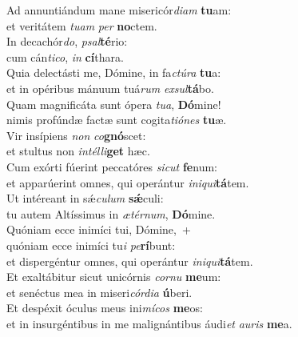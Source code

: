 \evenverse Ad annuntiándum mane misericór\textit{di}\textit{am} \textbf{tu}am:~\*\\
\evenverse et veritátem \textit{tu}\textit{am} \textit{per} \textbf{no}ctem.\\
\oddverse In decachór\textit{do}, \textit{psal}\textbf{té}rio:~\*\\
\oddverse cum cán\textit{ti}\textit{co}, \textit{in} \textbf{cí}thara.\\
\evenverse Quia delectásti me, Dómine, in fa\textit{ctú}\textit{ra} \textbf{tu}a:~\*\\
\evenverse et in opéribus mánuum tuá\textit{rum} \textit{ex}\textit{sul}\textbf{tá}bo.\\
\oddverse Quam magnificáta sunt ópera \textit{tu}\textit{a}, \textbf{Dó}mine!~\*\\
\oddverse nimis profúndæ factæ sunt cogita\textit{ti}\textit{ó}\textit{nes} \textbf{tu}æ.\\
\evenverse Vir insípiens \textit{non} \textit{co}\textbf{gnó}scet:~\*\\
\evenverse et stultus non \textit{in}\textit{tél}\textit{li}\textbf{get} hæc.\\
\oddverse Cum exórti fúerint peccatóres \textit{si}\textit{cut} \textbf{fe}num:~\*\\
\oddverse et apparúerint omnes, qui operántur \textit{i}\textit{ni}\textit{qui}\textbf{tá}tem.\\
\evenverse Ut intéreant in sǽ\textit{cu}\textit{lum} \textbf{sǽ}culi:~\*\\
\evenverse tu autem Altíssimus in \textit{æ}\textit{tér}\textit{num}, \textbf{Dó}mine.\\
\oddverse Quóniam ecce inimíci tui, Dómine,~+\\
\oddverse  quóniam ecce inimíci tu\textit{i} \textit{pe}\textbf{rí}bunt:~\*\\
\oddverse et dispergéntur omnes, qui operántur \textit{i}\textit{ni}\textit{qui}\textbf{tá}tem.\\
\evenverse Et exaltábitur sicut unicórnis \textit{cor}\textit{nu} \textbf{me}um:~\*\\
\evenverse et senéctus mea in miseri\textit{cór}\textit{di}\textit{a} \textbf{ú}beri.\\
\oddverse Et despéxit óculus meus ini\textit{mí}\textit{cos} \textbf{me}os:~\*\\
\oddverse et in insurgéntibus in me malignántibus áudi\textit{et} \textit{au}\textit{ris} \textbf{me}a.\\
